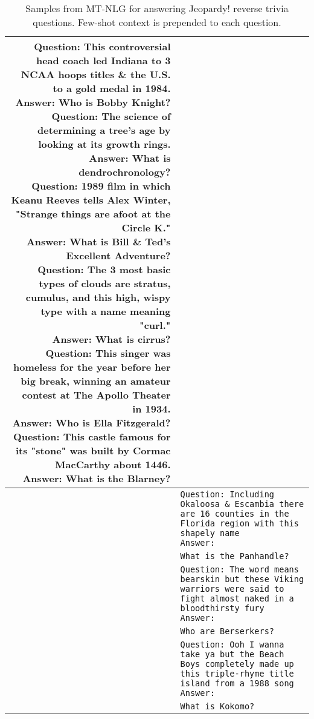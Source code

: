 \documentclass[11pt]{article}
\newcommand{\ours}{MT-NLG}
\begin{document}
\begin{table}[t]
\begin{adjustbox}{height=4.1in}
\begin{tabularx}{1.11\textwidth}{rX}
{Question: This controversial head coach led Indiana to 3 NCAA hoops titles \& the U.S. to a gold medal in 1984.\newline
Answer: Who is Bobby Knight?\newline
Question: The science of determining a tree’s age by looking at its growth rings.\newline
Answer: What is dendrochronology?\newline
Question: 1989 film in which Keanu Reeves tells Alex Winter, "Strange things are afoot at the Circle K."\newline
Answer: What is Bill \& Ted's Excellent Adventure?\newline
Question: The 3 most basic types of clouds are stratus, cumulus, and this high, wispy type with a name meaning "curl."\newline
Answer: What is cirrus?\newline
Question: This singer was homeless for the year before her big break, winning an amateur contest at The Apollo Theater in 1934.\newline
Answer: Who is Ella Fitzgerald?\newline
Question: This castle famous for its "stone" was built by Cormac MacCarthy about 1446.\newline
Answer: What is the Blarney?
}
 \\
 \midrule
\textbf{} &  \texttt{Question: Including Okaloosa \& Escambia there are 16 counties in the Florida region with this shapely name\newline
Answer:
}
 \\
\textbf{} &  \texttt{What is the Panhandle?}
 \\
 \midrule
\textbf{} &  \texttt{Question: The word means bearskin but these Viking warriors were said to fight almost naked in a bloodthirsty fury\newline
Answer:
}
 \\
\textbf{} &  \texttt{Who are Berserkers?}
 \\
 \midrule
\textbf{} &  \texttt{Question: Ooh I wanna take ya but the Beach Boys completely made up this triple-rhyme title island from a 1988 song\newline
Answer:
}
 \\
\textbf{} &  \texttt{What is Kokomo?}
 \\
\bottomrule
\end{tabularx}
\end{adjustbox}
\caption{Samples from {\ours} for answering Jeopardy! reverse trivia questions. Few-shot context is prepended to each question.}
\label{tab:jeopardy-questions}
\end{table}
\end{document}
